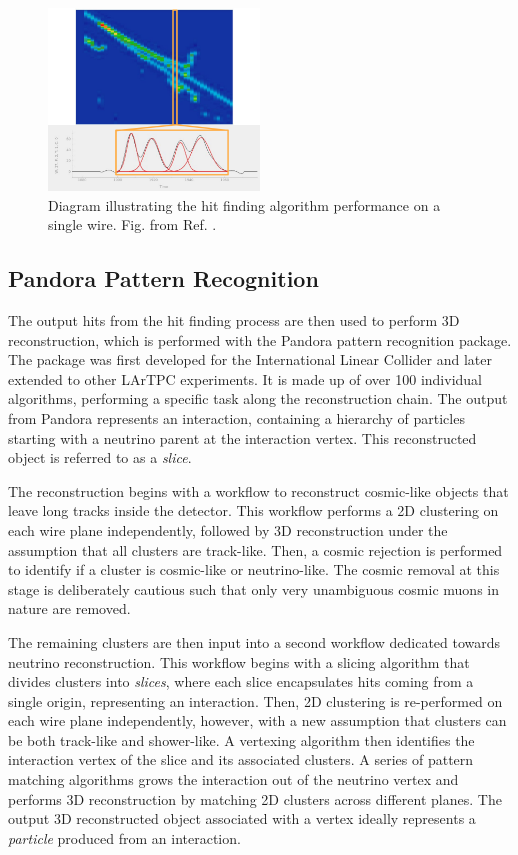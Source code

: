 \begin{figure}[htbp!] 
\centering    
\includegraphics[width=0.5\textwidth]{gaushit}
\caption[gaushit]{
Diagram illustrating the hit finding algorithm performance on a single wire.
Fig. from Ref. \cite{EdPhD}.
}
\label{fig:gaushit}
\end{figure}

\subsection{Pandora Pattern Recognition}

The output hits from the hit finding process are then used to perform 3D reconstruction, which is performed with the Pandora pattern recognition package\cite{pandora}.
The package was first developed for the International Linear Collider and later extended to other LArTPC experiments.
It is made up of over 100 individual algorithms, performing a specific task along the reconstruction chain.
The output from Pandora represents an interaction, containing a hierarchy of particles starting with a neutrino parent at the interaction vertex.
This reconstructed object is referred to as a \textit{slice}.

The reconstruction begins with a workflow to reconstruct cosmic-like objects that leave long tracks inside the detector.
This workflow performs a 2D clustering on each wire plane independently, followed by 3D reconstruction under the assumption that all clusters are track-like.
Then, a cosmic rejection is performed to identify if a cluster is cosmic-like or neutrino-like.
The cosmic removal at this stage is deliberately cautious such that only very unambiguous cosmic muons in nature are removed.

The remaining clusters are then input into a second workflow dedicated towards neutrino reconstruction.
This workflow begins with a slicing algorithm that divides clusters into \textit{slices}, where each slice encapsulates hits coming from a single origin, representing an interaction.
Then, 2D clustering is re-performed on each wire plane independently, however, with a new assumption that clusters can be both track-like and shower-like.
A vertexing algorithm then identifies the interaction vertex of the slice and its associated clusters.
A series of pattern matching algorithms grows the interaction out of the neutrino vertex and performs 3D reconstruction by matching 2D clusters across different planes.
The output 3D reconstructed object associated with a vertex ideally represents a \textit{particle} produced from an interaction.

